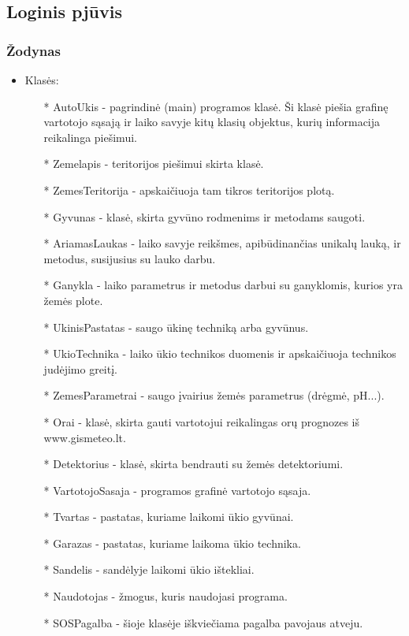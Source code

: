 \documentclass[oneside]{VUMIFPSkursinis}
\begin{document}
\subsection{Loginis pjūvis}
\subsubsection{Žodynas}
\begin{itemize}
	\item Klasės:
		\begin{itemize}
			\item[*] AutoUkis - pagrindinė (main) programos klasė. Ši klasė piešia grafinę vartotojo sąsają ir laiko savyje kitų klasių objektus, kurių informacija reikalinga piešimui.
			\item[*] Zemelapis - teritorijos piešimui skirta klasė.
			\item[*] ZemesTeritorija - apskaičiuoja tam tikros teritorijos plotą.
 			\item[*] Gyvunas - klasė, skirta gyvūno rodmenims ir metodams saugoti.
			\item[*] AriamasLaukas - laiko savyje reikšmes, apibūdinančias unikalų lauką, ir metodus, susijusius su lauko darbu.
			\item[*] Ganykla - laiko parametrus ir metodus darbui su ganyklomis, kurios yra žemės plote.
			\item[*] UkinisPastatas - saugo ūkinę techniką arba gyvūnus.
			\item[*] UkioTechnika - laiko ūkio technikos duomenis ir apskaičiuoja technikos judėjimo greitį.
			\item[*] ZemesParametrai - saugo įvairius žemės parametrus (drėgmė, pH...).
			\item[*] Orai - klasė, skirta gauti vartotojui reikalingas orų prognozes iš www.gismeteo.lt.
			\item[*] Detektorius - klasė, skirta bendrauti su žemės detektoriumi.
			\item[*] VartotojoSasaja - programos grafinė vartotojo sąsaja.
			\item[*] Tvartas - pastatas, kuriame laikomi ūkio gyvūnai.
			\item[*] Garazas - pastatas, kuriame laikoma ūkio technika.
			\item[*] Sandelis - sandėlyje laikomi ūkio ištekliai.
			\item[*] Naudotojas - žmogus, kuris naudojasi programa.
			\item[*] SOSPagalba - šioje klasėje iškviečiama pagalba pavojaus atveju.

\end{itemize}
\end{itemize}
\end{document}
